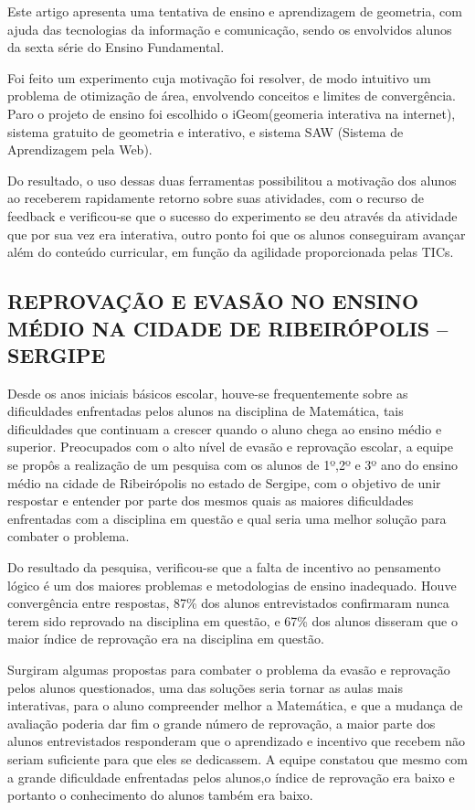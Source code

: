 \documentclass[12pt,a4paper]{article}
\begin{document}
Este artigo apresenta uma tentativa de ensino e aprendizagem de geometria, com ajuda das tecnologias da informação e comunicação, sendo os envolvidos alunos da sexta série do Ensino Fundamental. 

Foi feito um experimento cuja motivação foi resolver, de modo intuitivo um problema de otimização de área, envolvendo conceitos e limites de convergência. Paro o projeto de ensino foi escolhido o iGeom(geomeria interativa na internet), sistema gratuito de geometria e interativo, e sistema SAW (Sistema de Aprendizagem pela Web).

Do resultado, o uso dessas duas ferramentas possibilitou a motivação dos alunos ao receberem rapidamente retorno sobre suas atividades, com o recurso de feedback e verificou-se que o sucesso do experimento se deu através da atividade que por sua vez era interativa, outro ponto foi que os alunos conseguiram avançar além do conteúdo curricular, em função da agilidade proporcionada pelas TICs. \citep{tanbellini2010uso} 

\subsection{REPROVAÇÃO E EVASÃO NO ENSINO MÉDIO NA CIDADE DE  RIBEIRÓPOLIS – SERGIPE}
Desde os anos iniciais básicos escolar, houve-se frequentemente sobre as dificuldades enfrentadas pelos alunos na disciplina de Matemática, tais dificuldades que continuam a crescer quando o aluno chega ao ensino médio e superior. Preocupados com o alto nível de evasão e reprovação escolar, a equipe se propôs a realização de um pesquisa com os alunos de 1º,2º e 3º ano do ensino médio na cidade de Ribeirópolis no estado de Sergipe, com o objetivo de unir respostar e entender por parte dos mesmos quais as maiores dificuldades enfrentadas com a disciplina em questão e qual seria uma melhor solução para combater o problema.

Do resultado da pesquisa, verificou-se que a falta de incentivo ao pensamento lógico é um dos maiores problemas e metodologias de ensino inadequado. Houve convergência entre respostas, 87\% dos alunos entrevistados confirmaram nunca terem sido reprovado na disciplina em questão, e 67\% dos alunos disseram que o maior índice de reprovação era na disciplina em questão. 

Surgiram algumas propostas para combater o problema da evasão e reprovação pelos alunos questionados, uma das soluções seria tornar as aulas mais interativas, para o aluno compreender melhor a Matemática, e que a mudança de avaliação poderia dar fim o grande número de reprovação, a maior parte dos alunos entrevistados responderam que o aprendizado e incentivo que recebem não seriam suficiente para que eles se dedicassem. 
A equipe constatou que mesmo com a grande dificuldade enfrentadas pelos alunos,o índice de reprovação era baixo e portanto o conhecimento do alunos também era baixo. \citep{santosreprovaccao}
\end{document}
